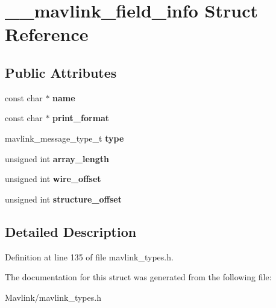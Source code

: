 \hypertarget{struct____mavlink__field__info}{}\section{\+\_\+\+\_\+mavlink\+\_\+field\+\_\+info Struct Reference}
\label{struct____mavlink__field__info}
\subsection*{Public Attributes}
\begin{DoxyCompactItemize}
\item 
\hypertarget{struct____mavlink__field__info_a09193c7acc510180ecf6f944381e53c2}{}\label{struct____mavlink__field__info_a09193c7acc510180ecf6f944381e53c2} 
const char $\ast$ {\bfseries name}
\item 
\hypertarget{struct____mavlink__field__info_af3fc635b6e03851bb683c0c3d57dfc12}{}\label{struct____mavlink__field__info_af3fc635b6e03851bb683c0c3d57dfc12} 
const char $\ast$ {\bfseries print\+\_\+format}
\item 
\hypertarget{struct____mavlink__field__info_a32f98e7c869ae1567c4ad366c74b6552}{}\label{struct____mavlink__field__info_a32f98e7c869ae1567c4ad366c74b6552} 
mavlink\+\_\+message\+\_\+type\+\_\+t {\bfseries type}
\item 
\hypertarget{struct____mavlink__field__info_aa3ab268c4176743874c8d05694ed293f}{}\label{struct____mavlink__field__info_aa3ab268c4176743874c8d05694ed293f} 
unsigned int {\bfseries array\+\_\+length}
\item 
\hypertarget{struct____mavlink__field__info_a7156648575e497f112fde78e851dd4d9}{}\label{struct____mavlink__field__info_a7156648575e497f112fde78e851dd4d9} 
unsigned int {\bfseries wire\+\_\+offset}
\item 
\hypertarget{struct____mavlink__field__info_acb947cd22e51e70e8b5f677b543196ac}{}\label{struct____mavlink__field__info_acb947cd22e51e70e8b5f677b543196ac} 
unsigned int {\bfseries structure\+\_\+offset}
\end{DoxyCompactItemize}


\subsection{Detailed Description}


Definition at line 135 of file mavlink\+\_\+types.\+h.



The documentation for this struct was generated from the following file\+:\begin{DoxyCompactItemize}
\item 
Mavlink/mavlink\+\_\+types.\+h\end{DoxyCompactItemize}
